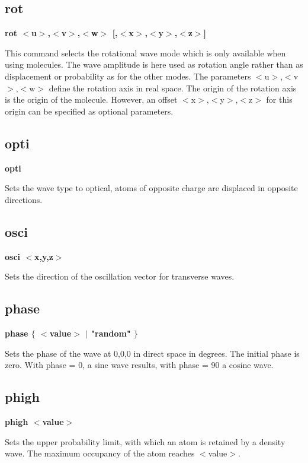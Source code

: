 \subsection*{rot}
{\bf rot $ <$u$> $,$ <$v$> $,$ <$w$> $ [,$ <$x$> $,$ <$y$> $,$ <$z$> $] \par }
\par
\vspace{3pt}
This command selects the rotational wave mode which is only available 
when using molecules. The wave amplitude is here used as rotation angle 
rather than as displacement or probability as for the other modes. 
The parameters $ <$u$> $,$ <$v$> $,$ <$w$> $ define the rotation axis in real space. The 
origin of the rotation axis is the origin of the molecule. However, 
an offset $ <$x$> $,$ <$y$> $,$ <$z$> $ for this origin can be specified as optional 
parameters. 
\subsection*{opti}
{\bf opti \par }
\par
\vspace{3pt}
Sets the wave type to optical, atoms of opposite charge are 
displaced in opposite directions. 
\subsection*{osci}
{\bf osci $ <$x,y,z$> $ \par }
\par
\vspace{3pt}
Sets the direction of the oscillation vector for transverse 
waves. 
\subsection*{phase}
{\bf phase $ \{$ $ <$value$> $ $| $ "random" $\} $ \par }
\par
\vspace{3pt}
Sets the phase of the wave at 0,0,0 in direct space in degrees. 
The initial phase is zero. With phase = 0, a sine wave 
results, with phase = 90 a cosine wave. 
\subsection*{phigh}
{\bf phigh $ <$value$> $ \par }
\par
\vspace{3pt}
Sets the upper probability limit, with which an atom is retained by a 
density wave. The maximum occupancy of the atom reaches $ <$value$> $. 
